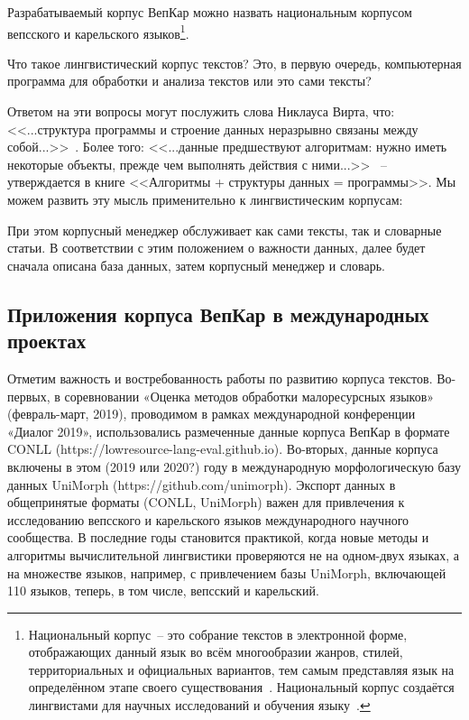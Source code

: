 Разрабатываемый корпус ВепКар можно назвать национальным корпусом 
вепсского и карельского языков\footnote{ Национальный корпус~-- это собрание текстов 
в электронной форме, 
отображающих данный язык во всём многообразии жанров, стилей, территориальных и официальных вариантов, 
тем самым представляя язык на определённом этапе своего существования~\cite[с.~418]{Kibrik2019}. 
Национальный корпус создаётся лингвистами для научных исследований и обучения языку~\cite[с.~419]{Kibrik2019}.
}.

Что такое лингвистический корпус текстов? Это, в первую очередь, компьютерная программа для обработки и анализа текстов или это сами тексты? 

Ответом на эти вопросы могут послужить слова Никлауса Вирта, что: 
<<...структура программы и строение данных неразрывно связаны между собой...>>~\cite[с.~9]{Wirth1989AlgorithmsAndDataStructure}. 
Более того:   
<<...данные предшествуют алгоритмам: нужно иметь некоторые объекты, 
прежде чем выполнять действия с ними...>>~\cite[с.~8]{Wirth1985Algorithms+} 
-- утверждается в книге <<Алгоритмы + структуры данных = программы>>.
Мы можем развить эту мысль применительно к лингвистическим корпусам:
        

\noindent
При этом корпусный менеджер обслуживает как сами тексты, так и словарные статьи. 
В соответствии с этим положением о важности данных, далее будет  
сначала описана база данных, затем корпусный менеджер и словарь.

\subsection{Приложения корпуса ВепКар в международных проектах} \label{sect_VepKar_international}


Отметим важность и востребованность работы по развитию корпуса текстов. 
Во-первых, в соревновании «Оценка методов обработки малоресурсных языков» (февраль-март, 2019), проводимом в рамках международной конференции «Диалог 2019», использовались размеченные данные корпуса ВепКар в формате CONLL (https://lowresource-lang-eval.github.io). 
Во-вторых, данные корпуса включены в этом (2019 или 2020?) году в международную морфологическую базу данных UniMorph (https://github.com/unimorph). Экспорт данных в общепринятые форматы (CONLL, UniMorph) важен для привлечения к исследованию вепсского и карельского языков международного научного сообщества. В последние годы становится практикой, когда новые методы и алгоритмы вычислительной лингвистики проверяются не на одном-двух языках, а на множестве языков, например, с привлечением базы UniMorph, включающей 110 языков, теперь, в том числе, вепсский и карельский. 

